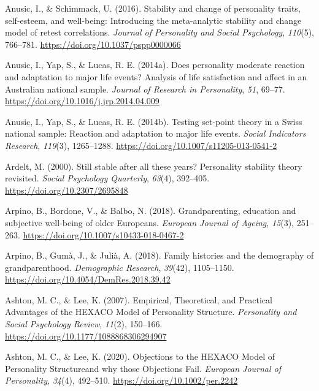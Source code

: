 \documentclass[
  english,
  man, noextraspace]{apa7}
\begin{document}
\leavevmode\hypertarget{ref-anusicStabilityChangePersonality2016}{}%
Anusic, I., \& Schimmack, U. (2016). Stability and change of personality traits, self-esteem, and well-being: Introducing the meta-analytic stability and change model of retest correlations. \emph{Journal of Personality and Social Psychology}, \emph{110}(5), 766--781. \url{https://doi.org/10.1037/pspp0000066}

\leavevmode\hypertarget{ref-anusicDoesPersonalityModerate2014}{}%
Anusic, I., Yap, S., \& Lucas, R. E. (2014a). Does personality moderate reaction and adaptation to major life events? Analysis of life satisfaction and affect in an Australian national sample. \emph{Journal of Research in Personality}, \emph{51}, 69--77. \url{https://doi.org/10.1016/j.jrp.2014.04.009}

\leavevmode\hypertarget{ref-anusicTestingSetpointTheory2014}{}%
Anusic, I., Yap, S., \& Lucas, R. E. (2014b). Testing set-point theory in a Swiss national sample: Reaction and adaptation to major life events. \emph{Social Indicators Research}, \emph{119}(3), 1265--1288. \url{https://doi.org/10.1007/s11205-013-0541-2}

\leavevmode\hypertarget{ref-ardeltStillStableAll2000}{}%
Ardelt, M. (2000). Still stable after all these years? Personality stability theory revisited. \emph{Social Psychology Quarterly}, \emph{63}(4), 392--405. \url{https://doi.org/10.2307/2695848}

\leavevmode\hypertarget{ref-arpinoGrandparentingEducationSubjective2018}{}%
Arpino, B., Bordone, V., \& Balbo, N. (2018). Grandparenting, education and subjective well-being of older Europeans. \emph{European Journal of Ageing}, \emph{15}(3), 251--263. \url{https://doi.org/10.1007/s10433-018-0467-2}

\leavevmode\hypertarget{ref-arpinoFamilyHistoriesDemography2018}{}%
Arpino, B., Gumà, J., \& Julià, A. (2018). Family histories and the demography of grandparenthood. \emph{Demographic Research}, \emph{39}(42), 1105--1150. \url{https://doi.org/10.4054/DemRes.2018.39.42}

\leavevmode\hypertarget{ref-ashtonEmpiricalTheoreticalPractical2007}{}%
Ashton, M. C., \& Lee, K. (2007). Empirical, Theoretical, and Practical Advantages of the HEXACO Model of Personality Structure. \emph{Personality and Social Psychology Review}, \emph{11}(2), 150--166. \url{https://doi.org/10.1177/1088868306294907}

\leavevmode\hypertarget{ref-ashtonObjectionsHEXACOModel2020}{}%
Ashton, M. C., \& Lee, K. (2020). Objections to the HEXACO Model of Personality Structureand why those Objections Fail. \emph{European Journal of Personality}, \emph{34}(4), 492--510. \url{https://doi.org/10.1002/per.2242}
\end{document}
